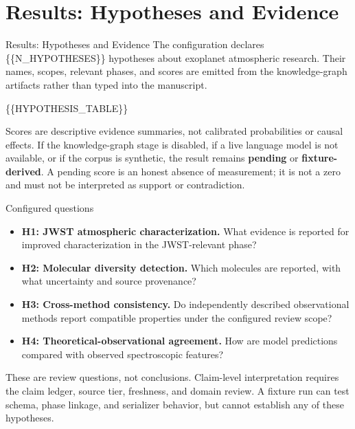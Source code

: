 \documentclass[
  ignorenonframetext,
]{beamer}
\author{}
\date{}
\providecommand{\tightlist}{%
  \setlength{\itemsep}{0pt}\setlength{\parskip}{0pt}}
\begin{document}
\section{Results: Hypotheses and
Evidence}\label{results-hypotheses-and-evidence}

\begin{frame}[allowframebreaks]{Results: Hypotheses and Evidence}
The configuration declares \{\{N\_HYPOTHESES\}\} hypotheses about
exoplanet atmospheric research. Their names, scopes, relevant phases,
and scores are emitted from the knowledge-graph artifacts rather than
typed into the manuscript.

\{\{HYPOTHESIS\_TABLE\}\}

Scores are descriptive evidence summaries, not calibrated probabilities
or causal effects. If the knowledge-graph stage is disabled, if a live
language model is not available, or if the corpus is synthetic, the
result remains \textbf{pending} or \textbf{fixture-derived}. A pending
score is an honest absence of measurement; it is not a zero and must not
be interpreted as support or contradiction.
\end{frame}

\begin{frame}[allowframebreaks]{Configured questions}
\label{configured-questions}
\begin{itemize}
\tightlist
\item
  \textbf{H1: JWST atmospheric characterization.} What evidence is
  reported for improved characterization in the JWST-relevant phase?
\item
  \textbf{H2: Molecular diversity detection.} Which molecules are
  reported, with what uncertainty and source provenance?
\item
  \textbf{H3: Cross-method consistency.} Do independently described
  observational methods report compatible properties under the
  configured review scope?
\item
  \textbf{H4: Theoretical-observational agreement.} How are model
  predictions compared with observed spectroscopic features?
\end{itemize}

These are review questions, not conclusions. Claim-level interpretation
requires the claim ledger, source tier, freshness, and domain review. A
fixture run can test schema, phase linkage, and serializer behavior, but
cannot establish any of these hypotheses.
\end{frame}
\end{document}
